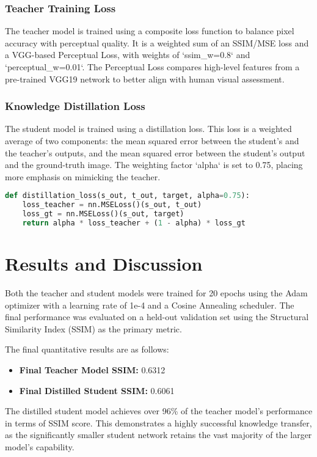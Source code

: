 \documentclass[12pt,a4paper]{article}
\begin{document}
\subsubsection{Teacher Training Loss}
The teacher model is trained using a composite loss function to balance pixel accuracy with perceptual quality. It is a weighted sum of an SSIM/MSE loss and a VGG-based Perceptual Loss, with weights of `ssim_w=0.8` and `perceptual_w=0.01`. The Perceptual Loss compares high-level features from a pre-trained VGG19 network to better align with human visual assessment.

\subsubsection{Knowledge Distillation Loss}
The student model is trained using a distillation loss. This loss is a weighted average of two components: the mean squared error between the student's and the teacher's outputs, and the mean squared error between the student's output and the ground-truth image. The weighting factor `alpha` is set to 0.75, placing more emphasis on mimicking the teacher.
\begin{lstlisting}[language=Python, caption={Knowledge Distillation Loss Function}]
def distillation_loss(s_out, t_out, target, alpha=0.75):
    loss_teacher = nn.MSELoss()(s_out, t_out)
    loss_gt = nn.MSELoss()(s_out, target)
    return alpha * loss_teacher + (1 - alpha) * loss_gt
\end{lstlisting}

\newpage
\section{Results and Discussion}
Both the teacher and student models were trained for 20 epochs using the Adam optimizer with a learning rate of 1e-4 and a Cosine Annealing scheduler. The final performance was evaluated on a held-out validation set using the Structural Similarity Index (SSIM) as the primary metric.

The final quantitative results are as follows:
\begin{itemize}
    \item \textbf{Final Teacher Model SSIM:} 0.6312
    \item \textbf{Final Distilled Student SSIM:} 0.6061
\end{itemize}

The distilled student model achieves over 96\% of the teacher model's performance in terms of SSIM score. This demonstrates a highly successful knowledge transfer, as the significantly smaller student network retains the vast majority of the larger model's capability.
\end{document}
